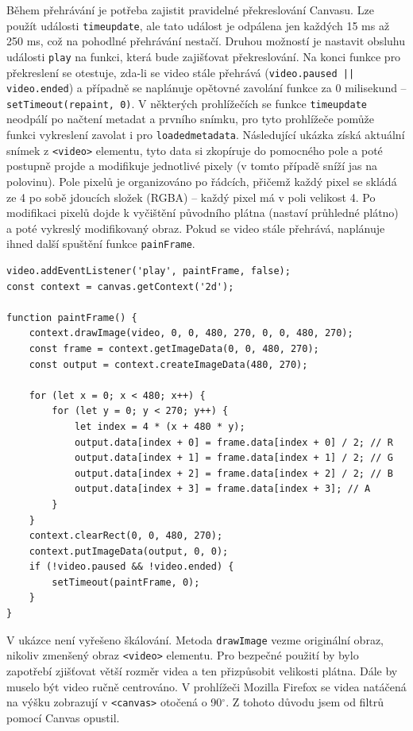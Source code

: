Během přehrávání je potřeba zajistit pravidelné překreslování Canvasu. Lze použít události \texttt{timeupdate}, ale tato událost je odpálena jen každých 15 ms až 250 ms, což na pohodlné přehrávání nestačí. Druhou možností je nastavit obsluhu události \texttt{play} na funkci, která bude zajišťovat překreslování. Na konci funkce pro překreslení  se otestuje, zda-li se video stále přehrává (\texttt{video.paused || video.ended}) a případně se naplánuje opětovné zavolání funkce za 0 milisekund -- \texttt{setTimeout(repaint, 0)}. V některých prohlížečích se funkce \texttt{timeupdate} neodpálí po načtení metadat a prvního snímku, pro tyto prohlížeče pomůže funkci vykreslení zavolat i pro \texttt{loadedmetadata}. Následující ukázka získá aktuální snímek z \texttt{<video>} elementu, tyto data si zkopíruje do pomocného pole a poté postupně projde a modifikuje jednotlivé pixely (v tomto případě sníží jas na polovinu). Pole pixelů je organizováno po řádcích, přičemž každý pixel se skládá ze 4 po sobě jdoucích složek (RGBA) -- každý pixel má v poli velikost 4. Po modifikaci pixelů dojde k vyčištění původního plátna (nastaví průhledné plátno) a poté vykreslý modifikovaný obraz. Pokud se video stále přehrává, naplánuje ihned další spuštění funkce \texttt{painFrame}.
\begin{lstlisting}[style=JavaScript]
video.addEventListener('play', paintFrame, false);
const context = canvas.getContext('2d');

function paintFrame() {
    context.drawImage(video, 0, 0, 480, 270, 0, 0, 480, 270);
    const frame = context.getImageData(0, 0, 480, 270);
    const output = context.createImageData(480, 270);
    
    for (let x = 0; x < 480; x++) {
        for (let y = 0; y < 270; y++) {
            let index = 4 * (x + 480 * y);
            output.data[index + 0] = frame.data[index + 0] / 2; // R
            output.data[index + 1] = frame.data[index + 1] / 2; // G
            output.data[index + 2] = frame.data[index + 2] / 2; // B
            output.data[index + 3] = frame.data[index + 3]; // A
        }
    }
    context.clearRect(0, 0, 480, 270);
    context.putImageData(output, 0, 0);
    if (!video.paused && !video.ended) {
        setTimeout(paintFrame, 0);
    }
}
\end{lstlisting}

V ukázce není vyřešeno škálování. Metoda \texttt{drawImage} vezme originální obraz, nikoliv zmenšený obraz \texttt{<video>} elementu. Pro bezpečné použití by bylo zapotřebí zjišťovat větší rozměr videa a ten přizpůsobit velikosti plátna. Dále by muselo být video ručně centrováno. V prohlížeči Mozilla Firefox se videa natáčená na výšku zobrazují v \texttt{<canvas>} otočená o 90$^{\circ}$. Z tohoto důvodu jsem od filtrů pomocí Canvas opustil.

